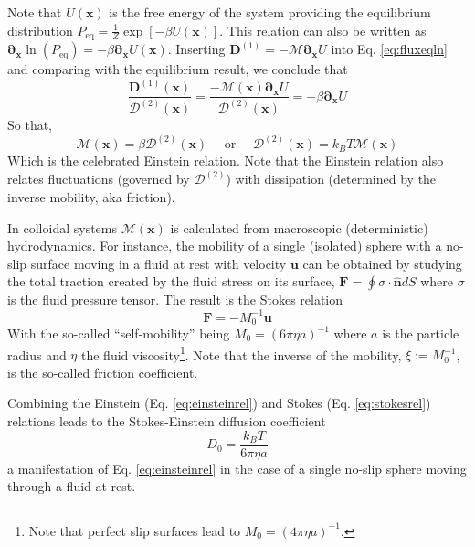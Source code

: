 \documentclass[ twoside,openright,titlepage,numbers=noenddot,%
headinclude,footinclude,cleardoublepage=empty,abstract=on,
BCOR=5mm,paper=b5,fontsize=11pt, dvipsnames
]{scrreprt}
\renewcommand{\vec}[1]{\bm{#1}}
\newcommand{\tens}[1]{\bm{\mathcal{#1}}}
\newcommand{\kT}{k_B T}
\newcommand{\pvel}{u}
\begin{document}
Note that $U(\vec{x})$ is the free energy of the system providing the equilibrium distribution $P_{\text{eq}} = \frac{1}{Z}\exp\left[-\beta U(\vec{x})\right]$. This relation can also be written as $\vec{\partial}_{\vec{x}}\ln\left(P_{\text{eq}}\right) = -\beta \vec{\partial}_{\vec{x}} U(\vec{x})$. Inserting $\vec{D}^{(1)} = -\tens{M}\vec{\partial}_{\vec{x}}U$ into Eq. \eqref{eq:fluxeqln} and comparing with the equilibrium result, we conclude that
\begin{equation}
  \frac{\vec{D}^{(1)}(\vec{x})}{\tens{D}^{(2)}(\vec{x})} = \frac{-\tens{M}(\vec{x})\vec{\partial}_{\vec{x}}U}{\tens{D}^{(2)}(\vec{x})} = -\beta\vec{\partial}_{\vec{x}}U
\end{equation}
So that,
\begin{equation}
  \label{eq:einsteinrel}
  \tens{M}(\vec{x}) = \beta\tens{D}^{(2)}(\vec{x})\quad\text{ or }\quad\tens{D}^{(2)}(\vec{x}) = \kT\tens{M}(\vec{x})
\end{equation}
Which is the celebrated Einstein relation. Note that the Einstein relation also relates fluctuations (governed by $\tens{D}^{(2)}$) with dissipation (determined by the inverse mobility, aka friction).

In colloidal systems $\tens{M}(\vec{x})$ is calculated from macroscopic (deterministic) hydrodynamics. For instance, the mobility of a single (isolated) sphere with a no-slip surface moving in a fluid at rest with velocity $\vec{\pvel}$ can be obtained \cite{Dhont1996} by studying the total traction created by the fluid stress on its surface, $\vec{F} = \oint\tens{\sigma}\cdot \hat{\vec{n}}dS$ where $\tens{\sigma}$ is the fluid pressure tensor. The result is the Stokes relation
\begin{equation}
  \label{eq:stokesrel}
  \vec{F} = -M_0^{-1} \vec{\pvel}
\end{equation}
With the so-called ``self-mobility'' being $M_0 = \left(6\pi\eta a\right)^{-1}$ where $a$ is the particle radius and $\eta$ the fluid viscosity\footnote{Note that perfect slip surfaces lead to $M_0 = (4\pi\eta a)^{-1}$.}. Note that the inverse of the mobility, $\xi := M_0^{-1}$, is the so-called friction coefficient.

Combining the Einstein (Eq. \eqref{eq:einsteinrel}) and Stokes (Eq. \eqref{eq:stokesrel}) relations leads to the Stokes-Einstein diffusion coefficient
\begin{equation}
  \label{eq:spherediff}
  D_0 = \frac{\kT}{6\pi\eta a}
\end{equation}
a manifestation of Eq. \eqref{eq:einsteinrel} in the case of a single no-slip sphere moving through a fluid at rest.
\end{document}
